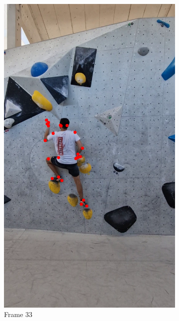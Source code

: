 \documentclass[./main.tex]{subfiles}
\begin{document}
\begin{figure}[htbp]
\begin{subfigure}{0.3\textwidth}
        \includegraphics[width=\textwidth]{entities/CA_33.png}
        \caption{Frame 33}
    \end{subfigure}
    \begin{subfigure}{0.3\textwidth}
        \centering

\end{subfigure}
\end{figure}
\end{document}

